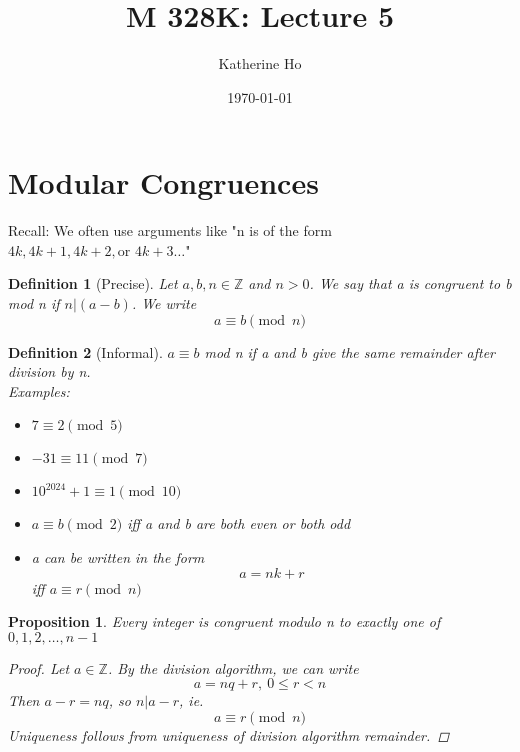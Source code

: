 \documentclass[letterpaper]{article}
\title{M 328K: Lecture 5}
\author{Katherine Ho}
\date\today
\newtheorem{definition}{Definition}[section]
\newtheorem{proposition}{Proposition}[section]
\begin{document}
\maketitle

\section{Modular Congruences}
    Recall: We often use arguments like "n is of the form $4k,4k+1,4k+2,
    \text{or }4k+3\dots$"

    \begin{definition} [Precise]
        Let $a,b,n\in\mathbb{Z}$ and $n>0$. We say that a is congruent to 
        b mod n if $n|(a-b)$. We write
        \[
            a \equiv b \pmod{n}
        \]
    \end{definition}

    \begin{definition} [Informal]
        $a\equiv b$ mod n if a and b give the same remainder after division
        by n. \\
        Examples:
        \begin{itemize}
            \item $7\equiv 2 \pmod 5$
            \item $-31\equiv 11 \pmod 7$
            \item $10^{2024}+1\equiv 1 \pmod 10$
            \item $a\equiv b \pmod 2$ iff a and b are both even or both odd
            \item a can be written in the form 
            \[ a=nk+r \]
                iff $a\equiv r \pmod n$
        \end{itemize}
    \end{definition}

    \begin{proposition}
        Every integer is congruent modulo n to exactly one of $0,1,2,\dots,n-1$
        \begin{proof}
            Let $a\in\mathbb{Z}$. By the division algorithm, we can write
            \[ a=nq+r,\ 0\leq r<n \]
            Then $a-r=nq$, so $n|a-r$, ie.
            \[ a\equiv r \pmod{n} \]
            Uniqueness follows from uniqueness of division algorithm remainder.
        \end{proof}
    \end{proposition}
\end{document}
